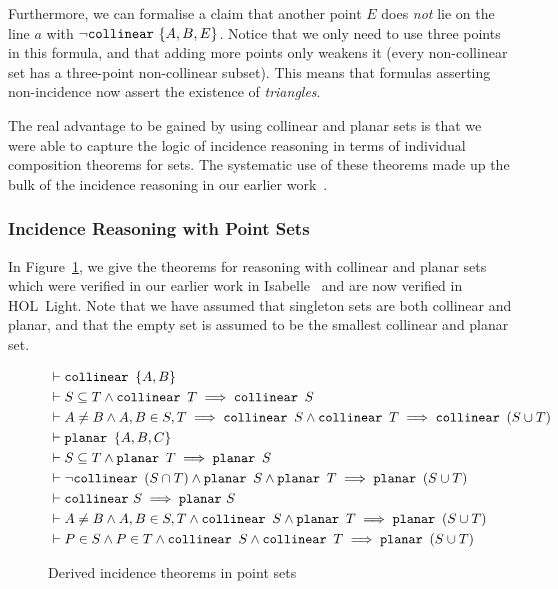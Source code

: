Furthermore, we can formalise a claim that another point $E$ does \emph{not} lie on the line $a$ with $\neg \texttt{collinear}\ \{A, B, E\}$. Notice that we only need to use three points in this formula, and that adding more points only weakens it (every non-collinear set has a three-point non-collinear subset). This means that formulas asserting non-incidence now assert the existence of \emph{triangles}.

The real advantage to be gained by using collinear and planar sets is that we were able to capture the logic of incidence reasoning in terms of individual composition theorems for sets. The systematic use of these theorems made up the bulk of the incidence reasoning in our earlier work~\cite{ScottMScThesis}.

\subsubsection{Incidence Reasoning with Point Sets}\label{sec:PointSets}
In Figure~\ref{fig:PointSets}, we give the theorems for reasoning with collinear and planar sets which were verified in our earlier work in Isabelle~\cite{ScottMScThesis} and are now verified in HOL~Light. Note that we have assumed that singleton sets are both collinear and planar, and that the empty set is assumed to be the smallest collinear and planar set.

\begin{figure}
\begin{align}
&\vdash\texttt{collinear}\ \, \{A,B\} \label{rule:colltwo}\\
&\vdash S \subseteq T \wedge \texttt{collinear}\ \, T \implies \texttt{collinear}\ \, S
  \label{rule:collsubset}\\
&\vdash A \neq B \wedge A,B \in S,T \implies \texttt{collinear}\ \, S \wedge \texttt{collinear}\ \, T \implies \texttt{collinear}\ \, (S \cup T) \label{rule:collunion}\\
&\vdash\texttt{planar}\ \, \{A,B,C\} \label{rule:planethree}\\
&\vdash S \subseteq T \wedge \texttt{planar}\ \, T \implies \texttt{planar}\ \, S
  \label{rule:planesubset}\\
&\vdash\neg\texttt{collinear}\ \, (S \cap T) \wedge \texttt{planar}\ \, S \wedge \texttt{planar}\ \, T \implies \texttt{planar}\ \, (S \cup T) \label{rule:planeunion}\\
&\vdash\texttt{collinear}\  S \implies \texttt{planar}\  S \label{rule:collplane}\\
&\vdash A \neq B \wedge A,B \in S,T \wedge \texttt{collinear}\ \, S \wedge \texttt{planar}\ \, T \implies \texttt{planar}\ \, (S \cup T) \label{rule:collplaneplane}\\
&\vdash P \in S \wedge P \in T \wedge \texttt{collinear}\ \, S \wedge \texttt{collinear}\ \, T \implies \texttt{planar}\ \, (S \cup T) \label{rule:collcollplane}
\end{align}
\caption{Derived incidence theorems in point sets}\label{fig:PointSets}
\end{figure}

